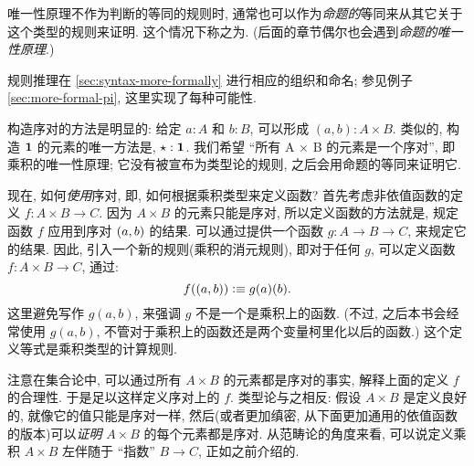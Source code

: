 \begin{rmk}
\begin{enumerate}
        唯一性原理不作为判断的等同的规则时, 通常也可以作为\emph{命题的}等同来从其它关于这个类型的规则来证明.
        这个情况下称之为.
        (后面的章节偶尔也会遇到\emph{命题的唯一性原理}.)
    \end{enumerate}
    规则推理在 \cref{sec:syntax-more-formally} 进行相应的组织和命名;
    参见例子 \cref{sec:more-formal-pi}, 这里实现了每种可能性.
\end{rmk}

构造序对的方法是明显的: 给定 $a:A$ 和 $b:B$, 可以形成 $(a,b):A\times B$.
类似的, 构造 $\mathbf{1}$ 的元素的唯一方法是, $\star:\mathbf{1}$.
我们希望 ``所有 A × B 的元素是一个序对'', 即乘积的唯一性原理;
它没有被宣布为类型论的规则, 之后会用命题的等同来证明它.

现在, 如何\emph{使用}序对, 即, 如何根据乘积类型来定义函数?
首先考虑非依值函数的定义 $f : A\times B \to C$.
因为 $A\times B$ 的元素只能是序对, 所以定义函数的方法就是, 规定函数 $f$ 应用到序对 $(a,b)$ 的结果.
可以通过提供一个函数 $g : A \to B \to C$, 来规定它的结果.
因此, 引入一个新的规则(乘积的消元规则), 即对于任何 $g$, 可以定义函数 $f : A\times B \to C$, 通过:
\[
    f((a,b)) \vcentcolon\equiv g(a)(b).
\]
这里避免写作 $g(a,b)$, 来强调 $g$ 不是一个是乘积上的函数.
(不过, 之后本书会经常使用 $g(a,b)$, 不管对于乘积上的函数还是两个变量柯里化以后的函数.)
这个定义等式是乘积类型的计算规则.

注意在集合论中, 可以通过所有 $A\times B$ 的元素都是序对的事实, 解释上面的定义 $f$ 的合理性.
于是足以这样定义序对上的 $f$.
类型论与之相反: 假设 $A\times B$ 是定义良好的, 就像它的值只能是序对一样, 然后(或者更加缜密, 从下面更加通用的依值函数的版本)可以\emph{证明} $A\times B$ 的每个元素都是序对.
从范畴论的角度来看, 可以说定义乘积 $A\times B$ 左伴随于 ``指数'' $B\to C$, 正如之前介绍的.


